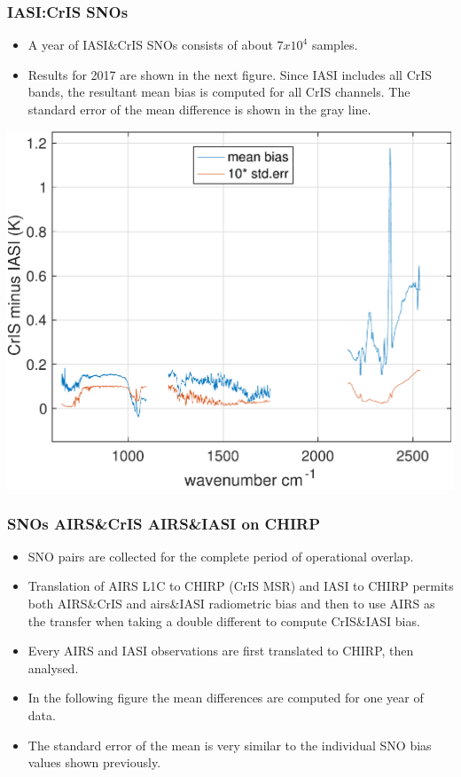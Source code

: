 \documentclass[10pt,t]{beamer}
\begin{document}
\begin{frame}
  \frametitle{IASI:CrIS SNOs}
  \begin{itemize}
  \item A year of IASI\&CrIS SNOs consists of about $7 x 10^4$ samples.
    \item Results for 2017 are shown in the next figure. Since IASI includes all CrIS bands, the resultant mean bias is computed for all CrIS channels. The standard error of the mean difference is shown in the gray line.
  \end{itemize}

  \begin{center}
    \includegraphics[width=0.8\linewidth]{./Figs/Pdf/ic_sno_nsr_2017_bias_stder_lw_mw_sw.pdf}
  \end{center}

\end{frame}

\begin{frame}
  \frametitle{SNOs AIRS\&CrIS AIRS\&IASI on CHIRP}
  \begin{itemize}
  \item SNO pairs are collected for the complete period of operational overlap.
  \item Translation of AIRS L1C to CHIRP (CrIS MSR) and IASI to CHIRP permits both AIRS\&CrIS and airs\&IASI radiometric bias and then to use AIRS as the transfer when taking a double different to compute CrIS\&IASI bias.
  \item Every AIRS and IASI observations are first translated to CHIRP, then analysed.
  \item In the following figure the mean differences are computed for one year of data.
    \item The standard error of the mean is very similar to the individual SNO bias values shown previously.
  \end{itemize}
\end{frame}
\end{document}
